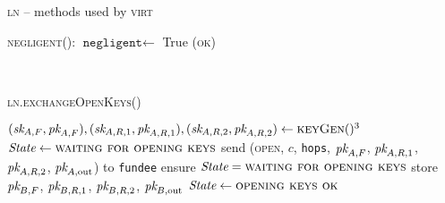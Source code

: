 \begin{center}
\begin{processbox}{\textsc{ln} -- methods used by \textsc{virt}}
\begin{algorithmic}[1]
      \State \textsc{negligent}():
      \Indent
        \State $\texttt{negligent} \gets$ True
        \label{code:ln:methods-for-virt:negligent}
        \State \Return (\textsc{ok})
      \EndIndent
    \end{algorithmic}
  \end{processbox}
  \label{code:ln:methods-for-virt}
\end{center} \ \\

\begin{center}
  \begin{processbox}{\textsc{ln.exchangeOpenKeys}()}
    \begin{algorithmic}[1]
      \State $(\textit{sk}_{A, F}, \textit{pk}_{A, F}), (\textit{sk}_{A, R, 1}, \textit{pk}_{A, R, 1}), (\textit{sk}_{A, R,
      2}, \textit{pk}_{A, R, 2}) \gets \textsc{keyGen}()^3$
      \State $\itistate \gets \textsc{waiting for opening keys}$
      \State send (\textsc{open}, $c$, \texttt{hops}, $\textit{pk}_{A, F}$, $\textit{pk}_{A, R,
      1}$, $\textit{pk}_{A, R, 2}$, $\textit{pk}_{A, \mathrm{out}}$) to \texttt{fundee}
      \label{code:ln:exchange-open-keys:bob-open}
      \State {}
      \State {}
      \State {}
      \State {}
      \State {}
       
        \State {}
        \State {} 
        \State {}
      \Else \: 
        \State {}
      \EndIf
      \State {}
      \label{code:ln:exchange-open-keys:accept-channel}
      \State ensure $\itistate = \textsc{waiting for opening keys}$
      \State store $\textit{pk}_{B, F}$, $\textit{pk}_{B, R, 1}$, $\textit{pk}_{B, R, 2}$, $\textit{pk}_{B,
      \mathrm{out}}$
      \State $\itistate \gets \textsc{opening keys ok}$
    \end{algorithmic}
  \end{processbox}
  \label{code:ln:exchange-open-keys}
\end{center} \ \\

